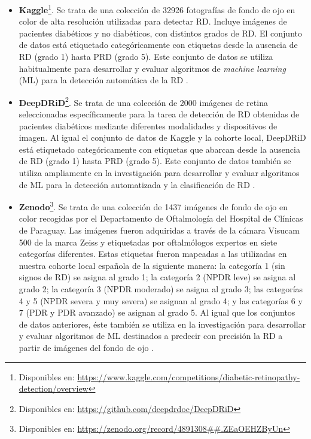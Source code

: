 \begin{itemize}[itemsep=0.25em]
    \item \textbf{Kaggle}\footnote{Disponibles en: \url{https://www.kaggle.com/competitions/diabetic-retinopathy-detection/overview}}. Se trata de una colección de 32926 fotografías de fondo de ojo en color de alta resolución utilizadas para detectar RD. Incluye imágenes de pacientes diabéticos y no diabéticos, con distintos grados de RD. El conjunto de datos está etiquetado categóricamente con etiquetas desde la ausencia de RD (grado 1) hasta PRD (grado 5). Este conjunto de datos se utiliza habitualmente para desarrollar y evaluar algoritmos de \textit{machine learning} (ML) para la detección automática de la RD \cite{datos:kaggle}.
    \item \textbf{DeepDRiD}\footnote{Disponibles en: \url{https://github.com/deepdrdoc/DeepDRiD}}. Se trata de una colección de 2000 imágenes de retina seleccionadas específicamente para la tarea de detección de RD obtenidas de pacientes diabéticos mediante diferentes modalidades y dispositivos de imagen. Al igual el conjunto de datos de Kaggle y la cohorte local, DeepDRiD está etiquetado categóricamente con etiquetas que abarcan desde la ausencia de RD (grado 1) hasta PRD (grado 5). Este conjunto de datos también se utiliza ampliamente en la investigación para desarrollar y evaluar algoritmos de ML para la detección automatizada y la clasificación de RD \cite{datos:deepdrid}.
    \item \textbf{Zenodo}\footnote{Disponibles en: \url{https://zenodo.org/record/4891308##.ZEaOEHZByUn}}. Se trata de una colección de 1437 imágenes de fondo de ojo en color recogidas por el Departamento de Oftalmología del Hospital de Clínicas de Paraguay. Las imágenes fueron adquiridas a través de la cámara Visucam 500 de la marca Zeiss y etiquetadas por oftalmólogos expertos en siete categorías diferentes. Estas etiquetas fueron mapeadas a las utilizadas en nuestra cohorte local española de la siguiente manera: la categoría 1 (sin signos de RD) se asigna al grado 1; la categoría 2 (NPDR leve) se asigna al grado 2; la categoría 3 (NPDR moderado) se asigna al grado 3; las categorías 4 y 5 (NPDR severa y muy severa) se asignan al grado 4; y las categorías 6 y 7 (PDR y PDR avanzado) se asignan al grado 5. Al igual que los conjuntos de datos anteriores, éste también se utiliza en la investigación para desarrollar y evaluar algoritmos de ML destinados a predecir con precisión la RD a partir de imágenes del fondo de ojo \cite{datos:zenodo}.
\end{itemize}

